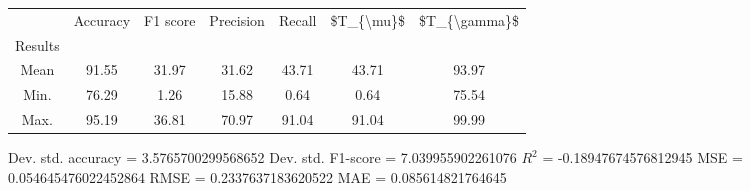 \begin{tabular}{|c|c|c|c|c|c|c|}
\toprule
{} &  Accuracy &  F1 score &  Precision &  Recall &  \$T\_\{\textbackslash mu\}\$ &  \$T\_\{\textbackslash gamma\}\$ \\
Results &           &           &            &         &            &               \\
\hline
Mean    &     91.55 &     31.97 &      31.62 &   43.71 &      43.71 &         93.97 \\
Min.    &     76.29 &      1.26 &      15.88 &    0.64 &       0.64 &         75.54 \\
Max.    &     95.19 &     36.81 &      70.97 &   91.04 &      91.04 &         99.99 \\
\bottomrule
\end{tabular}

 Dev. std. accuracy = 3.5765700299568652
 Dev. std. F1-score = 7.039955902261076
 $R^2$ = -0.18947674576812945
 MSE = 0.054645476022452864
 RMSE = 0.2337637183620522
 MAE = 0.085614821764645